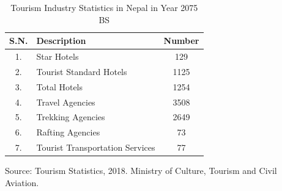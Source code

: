 \documentclass[12pt, a4paper, oneside]{article}
\begin{document}
\renewcommand{\arraystretch}{1.5}
\begin{table}[H]
\begin{tabularx}{\linewidth}{|c|X|c|}
\hline
\rowcolor[HTML]{C0C0C0} 
\textbf{S.N.}                & \textbf{Description} & \textbf{Number}   \\ \hline
1.  & Star Hotels     & 129                          \\ \hline
2.  & Tourist Standard Hotels    & 1125       \\ \hline
3.      & Total Hotels   & 1254          \\ \hline
4. & Travel Agencies    & 3508 \\ \hline
5. & Trekking Agencies & 2649            \\ \hline
6.  & Rafting Agencies    & 73          \\ \hline
7.      & Tourist Transportation Services  & 77      \\ \hline
\end{tabularx}
\footnotesize Source: Tourism Statistics, 2018. Ministry of Culture, Tourism and Civil Aviation. \cite{tourismstats}
\caption{Tourism Industry Statistics in Nepal in Year 2075 BS}
\label{table:tourismindustry}
\end{table}
\end{document}
